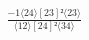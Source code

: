 \documentclass[varwidth, border=5pt]{standalone}
\begin{document}
\begin{my}
$\begin{gathered}
\scriptscriptstyle\frac{-1⟨24⟩[23]²⟨23⟩}{⟨12⟩[24]²⟨34⟩}
\end{gathered}$
\end{my}
\end{document}
